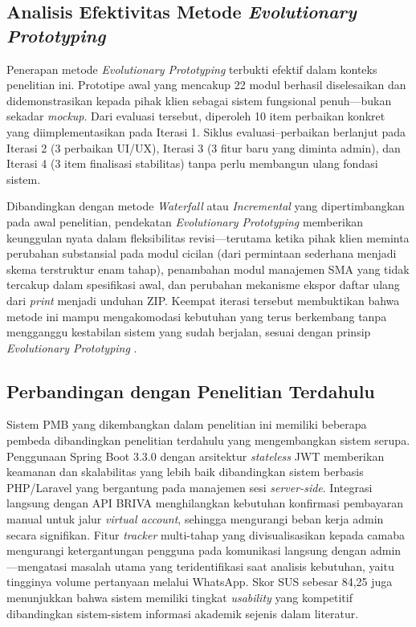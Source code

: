 \subsection{Analisis Efektivitas Metode \textit{Evolutionary Prototyping}} \label{IV.AnalisisPrototype}

Penerapan metode \textit{Evolutionary Prototyping} terbukti efektif dalam konteks penelitian ini. Prototipe awal yang mencakup 22 modul berhasil diselesaikan dan didemonstrasikan kepada pihak klien sebagai sistem fungsional penuh---bukan sekadar \textit{mockup}. Dari evaluasi tersebut, diperoleh 10 item perbaikan konkret yang diimplementasikan pada Iterasi 1. Siklus evaluasi--perbaikan berlanjut pada Iterasi 2 (3 perbaikan UI/UX), Iterasi 3 (3 fitur baru yang diminta admin), dan Iterasi 4 (3 item finalisasi stabilitas) tanpa perlu membangun ulang fondasi sistem.\par

Dibandingkan dengan metode \textit{Waterfall} atau \textit{Incremental} yang dipertimbangkan pada awal penelitian, pendekatan \textit{Evolutionary Prototyping} memberikan keunggulan nyata dalam fleksibilitas revisi---terutama ketika pihak klien meminta perubahan substansial pada modul cicilan (dari permintaan sederhana menjadi skema terstruktur enam tahap), penambahan modul manajemen SMA yang tidak tercakup dalam spesifikasi awal, dan perubahan mekanisme ekspor daftar ulang dari \textit{print} menjadi unduhan ZIP. Keempat iterasi tersebut membuktikan bahwa metode ini mampu mengakomodasi kebutuhan yang terus berkembang tanpa mengganggu kestabilan sistem yang sudah berjalan, sesuai dengan prinsip \textit{Evolutionary Prototyping} \cite{crinnion1991evolutionary}.\par

\subsection{Perbandingan dengan Penelitian Terdahulu} \label{IV.AnalisisPerbandingan}

Sistem PMB yang dikembangkan dalam penelitian ini memiliki beberapa pembeda dibandingkan penelitian terdahulu yang mengembangkan sistem serupa. Penggunaan Spring Boot 3.3.0 dengan arsitektur \textit{stateless} JWT memberikan keamanan dan skalabilitas yang lebih baik dibandingkan sistem berbasis PHP/Laravel yang bergantung pada manajemen sesi \textit{server-side}. Integrasi langsung dengan API BRIVA menghilangkan kebutuhan konfirmasi pembayaran manual untuk jalur \textit{virtual account}, sehingga mengurangi beban kerja admin secara signifikan. Fitur \textit{tracker} multi-tahap yang divisualisasikan kepada camaba mengurangi ketergantungan pengguna pada komunikasi langsung dengan admin---mengatasi masalah utama yang teridentifikasi saat analisis kebutuhan, yaitu tingginya volume pertanyaan melalui WhatsApp. Skor SUS sebesar 84{,}25 juga menunjukkan bahwa sistem memiliki tingkat \textit{usability} yang kompetitif dibandingkan sistem-sistem informasi akademik sejenis dalam literatur.\par

